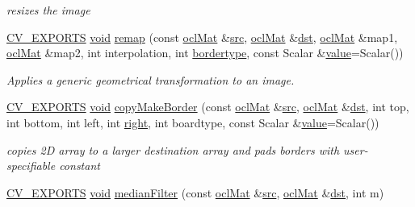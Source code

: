 \begin{DoxyCompactItemize}
\begin{DoxyCompactList}\small\item\em resizes the image \end{DoxyCompactList}\item 
\hyperlink{core_2types__c_8h_a1bf9f0e121b54272da02379cfccd0a2b}{C\-V\-\_\-\-E\-X\-P\-O\-R\-T\-S} \hyperlink{legacy_8hpp_a8bb47f092d473522721002c86c13b94e}{void} \hyperlink{namespacecv_1_1ocl_a73979487a156c1956946b7d586c12541}{remap} (const \hyperlink{classcv_1_1ocl_1_1oclMat}{ocl\-Mat} \&\hyperlink{legacy_8hpp_a371cd109b74033bc4366f584edd3dacc}{src}, \hyperlink{classcv_1_1ocl_1_1oclMat}{ocl\-Mat} \&\hyperlink{photo__c_8h_aed13e2a25279b24dc954073233fef7a5}{dst}, \hyperlink{classcv_1_1ocl_1_1oclMat}{ocl\-Mat} \&map1, \hyperlink{classcv_1_1ocl_1_1oclMat}{ocl\-Mat} \&map2, int interpolation, int \hyperlink{imgproc__c_8h_a217d51a46c1bcfec1157d02663e6e499}{bordertype}, const Scalar \&\hyperlink{highgui__c_8h_ad4670c92695d4327c21292905a803901}{value}=Scalar())
\begin{DoxyCompactList}\small\item\em Applies a generic geometrical transformation to an image. \end{DoxyCompactList}\item 
\hyperlink{core_2types__c_8h_a1bf9f0e121b54272da02379cfccd0a2b}{C\-V\-\_\-\-E\-X\-P\-O\-R\-T\-S} \hyperlink{legacy_8hpp_a8bb47f092d473522721002c86c13b94e}{void} \hyperlink{namespacecv_1_1ocl_ab19fdfce62f7e73530477c39de358eb0}{copy\-Make\-Border} (const \hyperlink{classcv_1_1ocl_1_1oclMat}{ocl\-Mat} \&\hyperlink{legacy_8hpp_a371cd109b74033bc4366f584edd3dacc}{src}, \hyperlink{classcv_1_1ocl_1_1oclMat}{ocl\-Mat} \&\hyperlink{photo__c_8h_aed13e2a25279b24dc954073233fef7a5}{dst}, int top, int bottom, int left, int \hyperlink{legacy_8hpp_a6b04b878081bf724144b73c75dfd1894}{right}, int boardtype, const Scalar \&\hyperlink{highgui__c_8h_ad4670c92695d4327c21292905a803901}{value}=Scalar())
\begin{DoxyCompactList}\small\item\em copies 2\-D array to a larger destination array and pads borders with user-\/specifiable constant \end{DoxyCompactList}\item 
\hyperlink{core_2types__c_8h_a1bf9f0e121b54272da02379cfccd0a2b}{C\-V\-\_\-\-E\-X\-P\-O\-R\-T\-S} \hyperlink{legacy_8hpp_a8bb47f092d473522721002c86c13b94e}{void} \hyperlink{namespacecv_1_1ocl_a1ca125c926952cc9d822c0f6cd542351}{median\-Filter} (const \hyperlink{classcv_1_1ocl_1_1oclMat}{ocl\-Mat} \&\hyperlink{legacy_8hpp_a371cd109b74033bc4366f584edd3dacc}{src}, \hyperlink{classcv_1_1ocl_1_1oclMat}{ocl\-Mat} \&\hyperlink{photo__c_8h_aed13e2a25279b24dc954073233fef7a5}{dst}, int m)

\end{DoxyCompactItemize}
